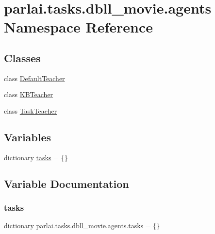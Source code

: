 \hypertarget{namespaceparlai_1_1tasks_1_1dbll__movie_1_1agents}{}\section{parlai.\+tasks.\+dbll\+\_\+movie.\+agents Namespace Reference}
\label{namespaceparlai_1_1tasks_1_1dbll__movie_1_1agents}
\subsection*{Classes}
\begin{DoxyCompactItemize}
\item 
class \hyperlink{classparlai_1_1tasks_1_1dbll__movie_1_1agents_1_1DefaultTeacher}{Default\+Teacher}
\item 
class \hyperlink{classparlai_1_1tasks_1_1dbll__movie_1_1agents_1_1KBTeacher}{K\+B\+Teacher}
\item 
class \hyperlink{classparlai_1_1tasks_1_1dbll__movie_1_1agents_1_1TaskTeacher}{Task\+Teacher}
\end{DoxyCompactItemize}
\subsection*{Variables}
\begin{DoxyCompactItemize}
\item 
dictionary \hyperlink{namespaceparlai_1_1tasks_1_1dbll__movie_1_1agents_a5e0551d7ded9d13465f6121663a99940}{tasks} = \{\}
\end{DoxyCompactItemize}


\subsection{Variable Documentation}
\mbox{\label{namespaceparlai_1_1tasks_1_1dbll__movie_1_1agents_a5e0551d7ded9d13465f6121663a99940}} 
\subsubsection{\texorpdfstring{tasks}{tasks}}
{\footnotesize\ttfamily dictionary parlai.\+tasks.\+dbll\+\_\+movie.\+agents.\+tasks = \{\}}

